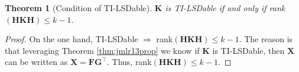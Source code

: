 \documentclass[journal]{IEEEtran}
\begin{document}
%
%
%
%
%
%
\newtheorem{thmmm}{\bf Theorem}
\setcounter{thmmm}{6}
\begin{thmmm}[Condition of TI-LSDable]
	$\mathbf{K}$ is TI-LSDable if and only if rank$(\mathbf{H}\mathbf{K}\mathbf{H}) \leq k-1$.
\end{thmmm}
\begin{proof}
	On the one hand, TI-LSDable $\Rightarrow$ rank$(\mathbf{H}\mathbf{K}\mathbf{H}) \leq k-1$. The reason is that leveraging Theorem \ref{thm:jmlr13prop} we know if $\mathbf{K}$ is TI-LSDable, then $\mathbf{X}$ can be written as $\mathbf{X}=\mathbf{FG}^\top$. Thus, rank$(\mathbf{H}\mathbf{K}\mathbf{H}) \leq k-1$.
	

\end{proof}
\end{document}
